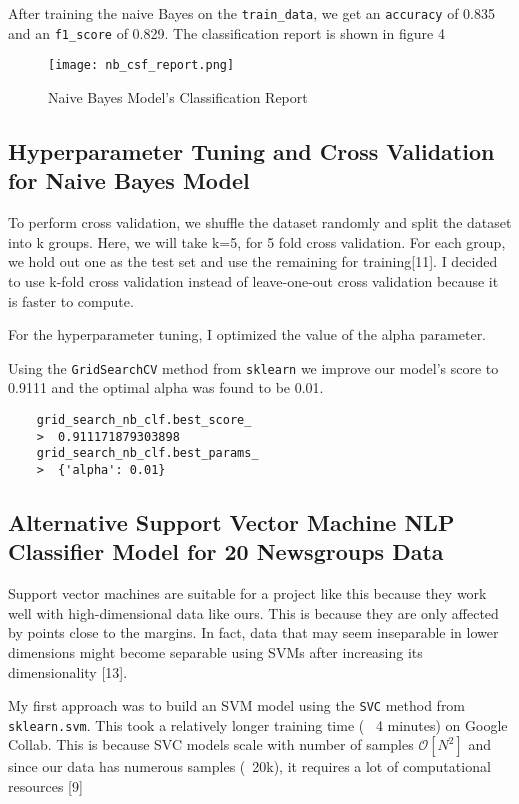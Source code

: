 \documentclass{article}
\begin{document}
After training the naive Bayes on the \texttt{train\_data}, we get an \texttt{accuracy} of 0.835 and an \texttt{f1\_score} of 0.829. The classification report is shown in figure 4 

\begin{figure}[htp]
    \centering
    \texttt{[image: nb\_csf\_report.png]}
    \caption{Naive Bayes Model's Classification Report}
    \label{fig:galaxy}
\end{figure}  

\subsection{Hyperparameter Tuning and Cross Validation for Naive Bayes Model} 

To perform cross validation, we shuffle the dataset randomly and split the dataset into k groups. Here, we will take k=5, for 5 fold cross validation. For each group, we hold out one as the test set and use the remaining for training[11]. I decided to use k-fold cross validation instead of leave-one-out cross validation because it is faster to compute. 

For the hyperparameter tuning, I optimized the value of the alpha parameter. 

Using the \texttt{GridSearchCV} method from \texttt{sklearn} we improve our model's score to 0.9111 and the optimal alpha was found to be 0.01.

\begin{lstlisting}
    grid_search_nb_clf.best_score_ 
    >  0.911171879303898
    grid_search_nb_clf.best_params_
    >  {'alpha': 0.01}
\end{lstlisting} 

\subsection{Alternative Support Vector Machine NLP Classifier Model for 20 Newsgroups Data} 
Support vector machines are suitable for a project like this because they work well with high-dimensional data like ours. This is because they are only affected by points close to the margins. In fact, data that may seem inseparable in lower dimensions might become separable using SVMs after increasing its dimensionality [13]. 

My first approach was to build an SVM model using the \texttt{SVC} method from \texttt{sklearn.svm}. This took a relatively longer training time (~ 4 minutes) on Google Collab. This is because SVC models scale with number of samples  $\mathcal{O}[N^2]$  and since our data has numerous samples (~20k), it requires a lot of computational resources [9] 
\end{document}
